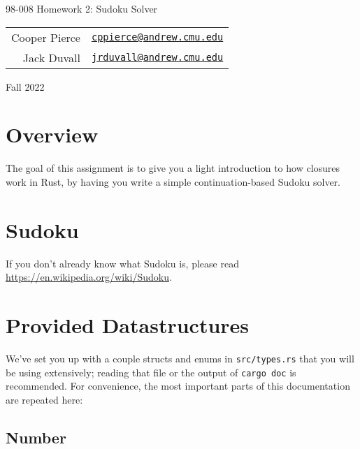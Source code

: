 \documentclass{article}
\newcommand{\longsemester}{Fall 2022}
\newcommand{\deptcode}{98}
\newcommand{\coursecode}{008}
\newcommand{\fullcoursecode}{\deptcode-\coursecode}
\begin{document}
\thispagestyle{empty}
\begin{center}
    \begin{minipage}{.85\textwidth}
        \centering
        {\huge {\fullcoursecode} Homework 2: Sudoku Solver}

        \vspace{1em}

        \begin{tabular}{@{}rl@{}}
            Cooper Pierce & \href{mailto:cppierce@andrew.cmu.edu}{\texttt{cppierce@andrew.cmu.edu}} \\
            Jack Duvall & \href{mailto:jrduvall@andrew.cmu.edu}{\texttt{jrduvall@andrew.cmu.edu}} \\
        \end{tabular}

        \vspace{1em}

        \longsemester
    \end{minipage}
\end{center}

\section*{Overview}

The goal of this assignment is to give you a light introduction to how closures work in Rust, by having you write a simple continuation-based Sudoku solver.

\section*{Sudoku}

If you don't already know what Sudoku is, please read \url{https://en.wikipedia.org/wiki/Sudoku}.

\section*{Provided Datastructures}

We've set you up with a couple structs and enums in \texttt{src/types.rs} that you will be using extensively; reading that file or the output of \texttt{cargo doc} is recommended. For convenience, the most important parts of this documentation are repeated here:

\subsection*{Number}
\end{document}
